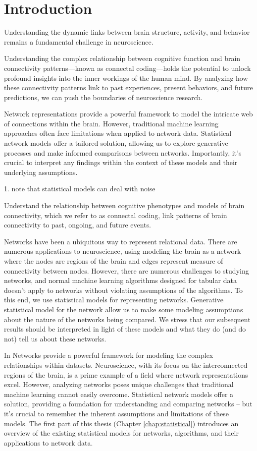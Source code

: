 \chapter{Introduction} \label{chap-intro}
\pagebreak

Understanding the dynamic links between brain structure, activity, and behavior remains a fundamental challenge in neuroscience. 

Understanding the complex relationship between cognitive function and brain connectivity patterns—known as connectal coding—holds the potential to unlock profound insights into the inner workings of the human mind. By analyzing how these connectivity patterns link to past experiences, present behaviors, and future predictions, we can push the boundaries of neuroscience research.

Network representations provide a powerful framework to model the intricate web of connections within the brain. However, traditional machine learning approaches often face limitations when applied to network data. Statistical network models offer a tailored solution, allowing us to explore generative processes and make informed comparisons between networks. Importantly, it's crucial to interpret any findings within the context of these models and their underlying assumptions.

1. note that statistical models can deal with noise

Understand the relationship between cognitive phenotypes and  models of brain connectivity, which we refer to as connectal coding, link patterns of brain connectivity to past, ongoing, and future events.

Networks have been a ubiquitous way to represent relational data. There are numerous applications to  neuroscience, using modeling the brain as a network where the nodes are regions of the brain and edges represent measure of connectivity between nodes. However, there are numerous challenges to studying networks, and normal machine learning algorithms designed for tabular data doesn't apply to networks without violating assumptions of the algorithms. To this end, we use statistical models for representing networks.  Generative statistical model for the network allow us to make some modeling assumptions about the nature of the networks being compared. We stress that our subsequent results should be interpreted in light of these models and what they do (and do not) tell us about these networks.

In Networks provide a powerful framework for modeling the complex relationships within datasets. Neuroscience, with its focus on the interconnected regions of the brain, is a prime example of a field where network representations excel.  However, analyzing networks poses unique challenges that traditional machine learning cannot easily overcome.   Statistical network models offer a solution, providing a foundation for understanding and comparing networks – but it's crucial to remember the inherent assumptions and limitations of these models. The first part of this thesis (Chapter \ref{chap:statistical}) introduces an overview of the existing statistical models for networks, algorithms, and their applications to network data. 

